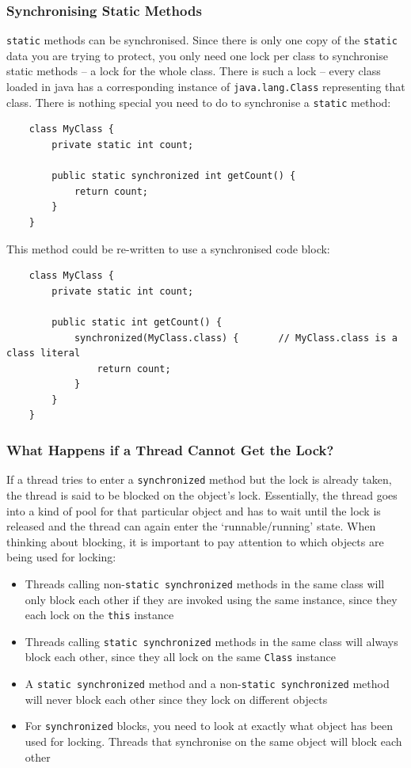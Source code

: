 \subsubsection{Synchronising Static Methods}
\verb#static# methods can be synchronised. Since there is only one copy of the 
\verb#static# data you are trying to protect, you only need one lock per class 
to synchronise static methods -- a lock for the whole class. There is such a 
lock -- every class loaded in java has a corresponding instance of 
\verb#java.lang.Class# representing that class. There is nothing special you 
need to do to synchronise a \verb#static# method:
\begin{verbatim}
    class MyClass {
        private static int count;

        public static synchronized int getCount() {
            return count;
        }
    }
\end{verbatim}
This method could be re-written to use a synchronised code block:
\begin{verbatim}
    class MyClass {
        private static int count;

        public static int getCount() {
            synchronized(MyClass.class) {       // MyClass.class is a class literal
                return count;
            }
        }
    }
\end{verbatim}

\subsubsection{What Happens if a Thread Cannot Get the Lock?}
If a thread tries to enter a \verb#synchronized# method but the lock is already 
taken, the thread is said to be blocked on the object's lock. Essentially, the 
thread goes into a kind of pool for that particular object and has to wait 
until the lock is released and the thread can again enter the 
`runnable/running' state.  When thinking about blocking, it is important to pay 
attention to which objects are being used for locking:
\begin{itemize}
    \item Threads calling non-\verb#static synchronized# methods in the same 
    class will only block each other if they are invoked using the same 
    instance, since they each lock on the \verb#this# instance
    \item Threads calling \verb#static synchronized# methods in the same class 
    will always block each other, since they all lock on the same \verb#Class# 
    instance
    \item A \verb#static synchronized# method and a non-\verb#static synchronized# method will never block each other since they lock on 
    different objects
    \item For \verb#synchronized# blocks, you need to look at exactly what 
    object has been used for locking. Threads that synchronise on the same 
    object will block each other
\end{itemize}

